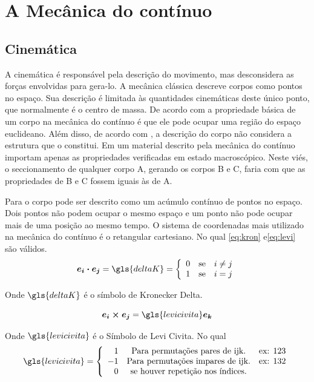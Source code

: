 \chapter{A Mecânica do contínuo} \label{Cap:MecCont}

\section{Cinemática}
A cinemática é responsável pela descrição do movimento, mas desconsidera as forças envolvidas para gera-lo. A mecânica clássica descreve corpos como pontos no espaço. Sua descrição é limitada às quantidades cinemáticas deste único ponto, que normalmente é o centro de massa. De acordo com \cite{gurtin_fried_anand_2013} a propriedade básica de um corpo na mecânica do contínuo é que ele pode ocupar uma região do espaço euclideano. Além disso, de acordo com \cite{tadmor_miller_elliott_2012}, a descrição do corpo não considera a estrutura que o constitui. Em um material descrito pela mecânica do contínuo importam apenas as propriedades verificadas em estado macroscópico. Neste viés, o seccionamento de qualquer corpo A, gerando os corpos B e C, faria com que as propriedades de B e C fossem iguais às de A.  \par

Para \cite{hiermaier_2008} o corpo pode ser descrito como um acúmulo contínuo de pontos no espaço. Dois pontos não podem ocupar o mesmo espaço e um ponto não pode ocupar mais de uma posição ao mesmo tempo. O sistema de coordenadas mais utilizado na mecânica do contínuo é o retangular cartesiano. No qual \ref{eq:kron} e\ref{eq:levi} são válidos. 
\begin{equation} \label{eq:kron}
    \boldsymbol{e_i \cdot e_j} = \gls{deltaK} = \left \{ \begin{array}{rcl}
       0  & \mbox{se} & i \neq j  \\
       1  & \mbox{se} & i = j
    \end{array} \right.
\end{equation}

Onde $ \gls{deltaK} $ é o símbolo de Kronecker Delta.

\begin{equation} \label{eq:levi}
    \boldsymbol{e_i \times e_j} = \gls{levicivita}\boldsymbol{e_k}
\end{equation}

Onde $ \gls{levicivita} $ é o Símbolo de Levi Civita. No qual 
\begin{equation}
    \gls{levicivita} = \left \{ \begin{array}{rcl}
       1  & \mbox{Para permutações pares de ijk.} & \mbox{ex: } 123  \\
       -1  & \mbox{Para permutações impares de ijk.} & \mbox{ex: } 132  \\
       0  & \mbox{se houver repetição nos índices.} 
    \end{array} \right.
\end{equation}

